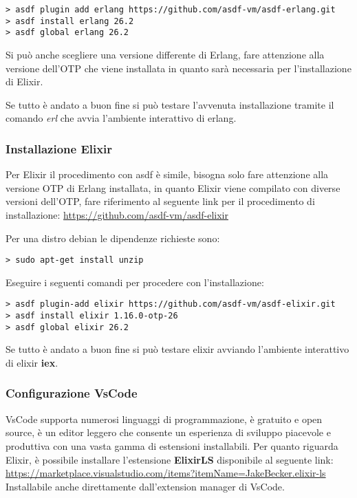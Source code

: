 \begin{lstlisting}[language=none]
> asdf plugin add erlang https://github.com/asdf-vm/asdf-erlang.git
> asdf install erlang 26.2
> asdf global erlang 26.2 
\end{lstlisting}

Si può anche scegliere una versione differente di Erlang, fare attenzione
alla versione dell'OTP che viene installata in quanto sarà
necessaria per l'installazione di Elixir.

Se tutto è andato a buon fine si può testare l'avvenuta installazione
tramite il comando \textit{erl} che avvia l'ambiente interattivo di erlang.

\subsubsection{Installazione Elixir}

Per Elixir il procedimento con asdf è simile, bisogna solo fare
attenzione alla versione OTP di Erlang installata, in quanto
Elixir viene compilato con diverse versioni dell'OTP,
fare riferimento al seguente link per il procedimento di installazione:
\url{https://github.com/asdf-vm/asdf-elixir}

Per una distro debian le dipendenze richieste sono:
\begin{lstlisting}[language=none]
> sudo apt-get install unzip
\end{lstlisting}

Eseguire i seguenti comandi per procedere con l'installazione:
\begin{lstlisting}[language=none]
> asdf plugin-add elixir https://github.com/asdf-vm/asdf-elixir.git
> asdf install elixir 1.16.0-otp-26
> asdf global elixir 26.2 
\end{lstlisting}

Se tutto è andato a buon fine si può testare elixir avviando l'ambiente
interattivo di elixir \textbf{iex}.


\subsubsection{Configurazione VsCode}

VsCode supporta numerosi linguaggi di programmazione, è gratuito e
open source, è un editor leggero che consente un esperienza di sviluppo
piacevole e produttiva con una vasta gamma di estensioni installabili.
Per quanto riguarda Elixir, è possibile installare l'estensione
\textbf{ElixirLS} disponibile al seguente link:
\url{https://marketplace.visualstudio.com/items?itemName=JakeBecker.elixir-ls}
Installabile anche direttamente dall'extension manager di VsCode.
 